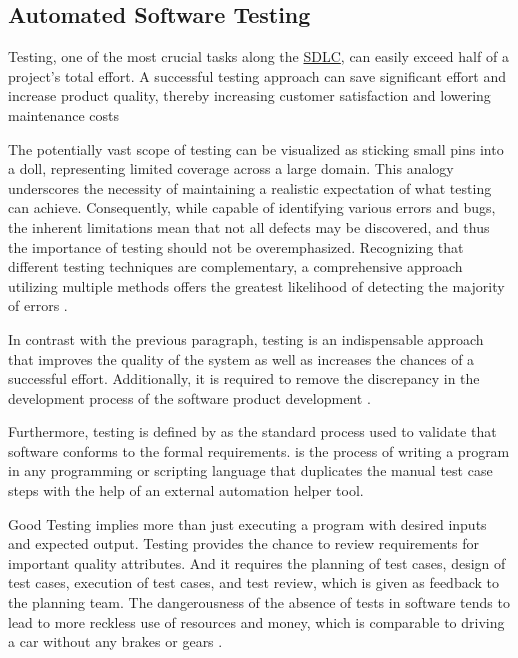 \subsection{Automated Software Testing}
\label{subsection:automated_software_testing}

Testing, one of the most crucial tasks along the \hyperref[appendix:glossary]{SDLC}, can easily exceed half of a project’s total effort. A successful testing approach can save significant effort and increase product quality, thereby increasing customer satisfaction and lowering maintenance costs \cite{juristo2006guest, tuteja2012research}

The potentially vast scope of testing can be visualized as sticking small pins into a doll, representing limited coverage across a large domain. This analogy underscores the necessity of maintaining a realistic expectation of 
what testing can achieve. Consequently, while capable of identifying various errors and bugs, the inherent limitations mean that not all defects may be discovered, and thus the importance of testing should not be overemphasized. 
Recognizing that different testing techniques are complementary, a comprehensive approach utilizing multiple methods offers the greatest likelihood of detecting the majority of errors 
\cite{meyer2008seven, pocatilu2002automated, sethi2017review, yadav2019software}.

In contrast with the previous paragraph, testing is an indispensable approach that improves the quality of the system as well as increases the chances of a successful effort. Additionally, it is required to remove the discrepancy in the development process of the software product development \cite{jindal2016importance}.

Furthermore, testing is defined by \cite{huang2003automated} as the standard process used to validate that software conforms to the formal requirements. \cite{vijayasree2022review} is the process of writing a program in any programming or scripting language that duplicates the manual test case steps with the help of an external automation helper tool. 

Good Testing implies more than just executing a program with desired inputs and expected output. Testing provides the chance to review requirements for important quality attributes. And it requires the planning of test cases, design of test cases, execution of test cases, and test review, which is given as feedback to the planning team. The dangerousness of the absence of tests in software tends to lead to more reckless use of resources and money, which is comparable to driving a car without any brakes or gears \cite{madhavi2016white}.

